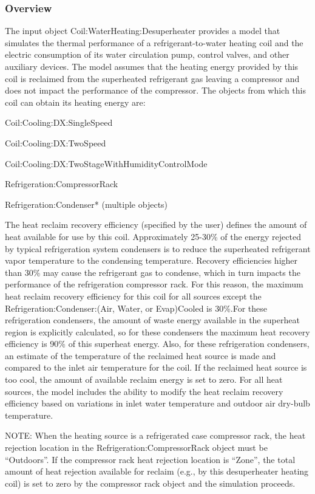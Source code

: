 \subsubsection{Overview}\label{overview-10}

The input object Coil:WaterHeating:Desuperheater provides a model that simulates the thermal performance of a refrigerant-to-water heating coil and the electric consumption of its water circulation pump, control valves, and other auxiliary devices. The model assumes that the heating energy provided by this coil is reclaimed from the superheated refrigerant gas leaving a compressor and does not impact the performance of the compressor. The objects from which this coil can obtain its heating energy are:

Coil:Cooling:DX:SingleSpeed

Coil:Cooling:DX:TwoSpeed

Coil:Cooling:DX:TwoStageWithHumidityControlMode

Refrigeration:CompressorRack

Refrigeration:Condenser* (multiple objects)

The heat reclaim recovery efficiency (specified by the user) defines the amount of heat available for use by this coil. Approximately 25-30\% of the energy rejected by typical refrigeration system condensers is to reduce the superheated refrigerant vapor temperature to the condensing temperature. Recovery efficiencies higher than 30\% may cause the refrigerant gas to condense, which in turn impacts the performance of the refrigeration compressor rack. For this reason, the maximum heat reclaim recovery efficiency for this coil for all sources except the Refrigeration:Condenser:(Air, Water, or Evap)Cooled is 30\%.For these refrigeration condensers, the amount of waste energy available in the superheat region is explicitly calculated, so for these condensers the maximum heat recovery efficiency is 90\% of this superheat energy. Also, for these refrigeration condensers, an estimate of the temperature of the reclaimed heat source is made and compared to the inlet air temperature for the coil. If the reclaimed heat source is too cool, the amount of available reclaim energy is set to zero. For all heat sources, the model includes the ability to modify the heat reclaim recovery efficiency based on variations in inlet water temperature and outdoor air dry-bulb temperature.

NOTE: When the heating source is a refrigerated case compressor rack, the heat rejection location in the Refrigeration:CompressorRack object must be ``Outdoors''. If the compressor rack heat rejection location is ``Zone'', the total amount of heat rejection available for reclaim (e.g., by this desuperheater heating coil) is set to zero by the compressor rack object and the simulation proceeds.


